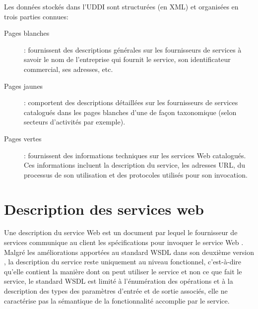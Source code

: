   Les données stockés dans l'\textsc{UDDI} sont structurées (en
  \textsc{XML}) et organisées en trois parties connues:

  \SpecialItem
  \begin{description}
    \item[Pages blanches]: fournissent des descriptions générales sur
      les fournisseurs de services à savoir le nom de l'entreprise qui
      fournit le service, son identificateur commercial, ses adresses,
      etc.

    \item[Pages jaunes]: comportent des descriptions détaillées sur
      les fournisseurs de services catalogués dans les pages blanches
      d'une de façon taxonomique (selon secteurs d'activités par
      exemple).

    \item[Pages vertes]: fournissent des informations techniques sur
      les services Web catalogués. Ces informations incluent la
      description du service, les adresses \textsc{URL}, du processus
      de son utilisation et des protocoles utilisés pour son
      invocation.
  \end{description}



\section{Description des services web}
\label{sec:ws-description}


Une description du service Web est un document par lequel le
fournisseur de services communique au client les spécifications pour
invoquer le service Web \cite{lopez2008selection}. Malgré les
améliorations apportées au standard \textsc{WSDL} dans son deuxième
version \cite{chinnici2007web}, la description du service reste
uniquement au niveau fonctionnel, c'est-à-dire qu'elle contient la
manière dont on peut utiliser le service et non ce que fait le
service, le standard \textsc{WSDL} est limité à l'énumération des
opérations et à la description des types des paramètres d'entrée et de
sortie associés, elle ne caractérise pas la sémantique de la
fonctionnalité accomplie par le service.

